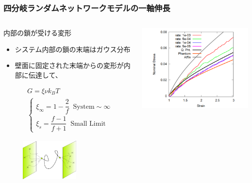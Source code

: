 \documentclass[11pt, dvipdfmx]{beamer}
\begin{document}
\begin{frame}
\frametitle{四分岐ランダムネットワークモデルの一軸伸長}

\vspace{-2mm}
\begin{columns}[totalwidth=\linewidth]

\begin{exampleblock}{内部の鎖が受ける変形}
\begin{itemize}
\item
システム内部の鎖の末端はガウス分布
\item
壁面に固定された末端からの変形が内部に伝達して、
\end{itemize}
\vspace{-5mm}
\tiny
\begin{align*}
&G=\xi \nu k_BT \\
&\begin{cases}
\xi_{\infty} = 1-\dfrac{2}{f} \;\; \text{System}\sim \infty \\[8pt]
\xi_{s} = \dfrac{f-1}{f+1} \;\; \text{Small Limit}
\end{cases}
\end{align*}
\vspace{-7mm}
\begin{figure}
\centering
\includegraphics[width=0.6\textwidth]{./fig/phantom.png}
\end{figure}
\end{exampleblock}

\includegraphics[width=1.2\columnwidth]{./fig/4_ChainSS_multi.png}


\end{columns}
\end{frame}
\end{document}
